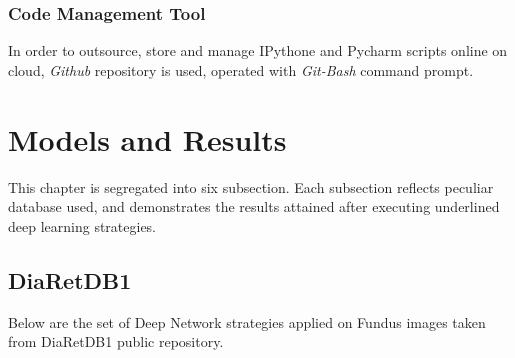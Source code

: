 \documentclass[12pt,a4paper,titlepage]{report}
\begin{document}
\subsection{Code Management Tool}
In order to outsource, store and manage IPythone and Pycharm scripts online on cloud, \textit{Github} repository is used, operated with \textit{Git-Bash} command prompt.

\chapter{Models and Results}

This chapter is segregated into six subsection. Each subsection reflects peculiar database used, and demonstrates the results attained after executing underlined deep learning strategies.

\section{DiaRetDB1}
Below are the set of Deep Network strategies applied on Fundus images taken from DiaRetDB1 public repository. 
\end{document}
